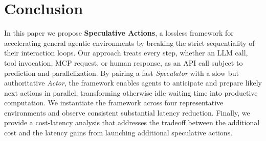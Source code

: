 \section{Conclusion}
\label{sec:conclusion}
In this paper we propose \textbf{Speculative Actions}, a lossless framework for accelerating general agentic environments by breaking the strict sequentiality of their interaction loops. Our approach treats every step, whether an LLM call, tool invocation, MCP request, or human response, as an API call subject to prediction and parallelization. By pairing a fast \emph{Speculator} with a slow but authoritative \emph{Actor}, the framework enables agents to anticipate and prepare likely next actions in parallel, transforming otherwise idle waiting time into productive computation. We instantiate the framework across four representative environments and observe consistent substantial latency reduction. Finally, we provide a cost-latency analysis that addresses the tradeoff between the additional cost and the latency gains from launching additional speculative actions.




